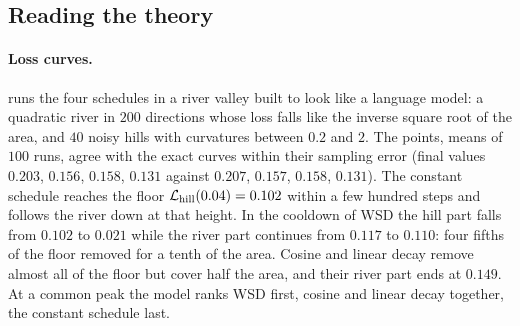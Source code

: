 \begin{refsection}

\section{Reading the theory}\label{sec:schedules:reading}

\paragraph{Loss curves.}  runs the four schedules in a river valley built to look like a language model: a quadratic river in $200$ directions whose loss falls like the inverse square root of the area, and $40$ noisy hills with curvatures between $0.2$ and $2$. The points, means of $100$ runs, agree with the exact curves within their sampling error (final values $0.203$, $0.156$, $0.158$, $0.131$ against $0.207$, $0.157$, $0.158$, $0.131$). The constant schedule reaches the floor $\mathcal{L}_{\mathrm{hill}}(0.04)=0.102$ within a few hundred steps and follows the river down at that height. In the cooldown of WSD the hill part falls from $0.102$ to $0.021$ while the river part continues from $0.117$ to $0.110$: four fifths of the floor removed for a tenth of the area. Cosine and linear decay remove almost all of the floor but cover half the area, and their river part ends at $0.149$. At a common peak the model ranks WSD first, cosine and linear decay together, the constant schedule last.


\end{refsection}
